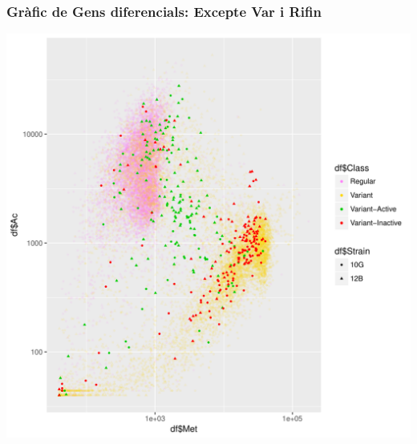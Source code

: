 \documentclass{article}\usepackage[]{graphicx}\usepackage[]{color}
\newenvironment{knitrout}{}{} %
\begin{document}
\subsubsection{Gràfic de Gens diferencials: Excepte Var i Rifin}
\begin{knitrout}
\color{fgcolor}

{\centering \includegraphics[width=1\linewidth]{figure/minimal-ac_met_log_status_10G_12B_novarifin-1} 

}



\end{knitrout}
\clearpage
\end{document}
